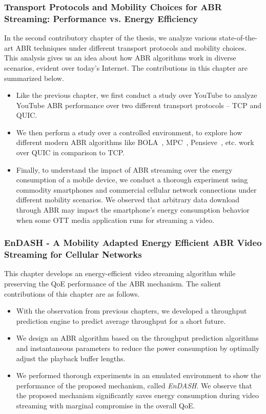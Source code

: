 \subsubsection{Transport Protocols and Mobility Choices for ABR Streaming: Performance vs. Energy Efficiency}
In the second contributory chapter of the thesis, we analyze various state-of-the-art ABR techniques under different transport protocols and mobility choices. This analysis gives us an idea about how ABR algorithms work in diverse scenarios, evident over today's Internet. The contributions in this chapter are summarized below. 
\begin{itemize}
	\item Like the previous chapter, we first conduct a study over YouTube to analyze YouTube ABR performance over two different transport protocols -- TCP and QUIC.
	\item We then perform a study over a controlled environment, to explore how different modern ABR algorithms like BOLA~\cite{Spiteri2016}, MPC~\cite{yin2015control}, Pensieve~\cite{mao2017neural}, etc. work over QUIC in comparison to TCP.
	\item Finally, to understand the impact of ABR streaming over the energy consumption of a mobile device, we conduct a thorough experiment using commodity smartphones and commercial cellular network connections under different mobility scenarios. We observed that arbitrary data download through ABR may impact the smartphone's energy consumption behavior when some OTT media application runs for streaming a video. 
\end{itemize}

\subsubsection{EnDASH - A Mobility Adapted Energy Efficient ABR Video Streaming for Cellular Networks}
This chapter develops an energy-efficient video streaming algorithm while preserving the QoE performance of the ABR mechanism. The salient contributions of this chapter are as follows. 
\begin{itemize}
	\item With the observation from previous chapters, we developed a throughput prediction engine to predict average throughput for a short future.
	\item We design an ABR algorithm based on the throughput prediction algorithms and instantaneous parameters to reduce the power consumption by optimally adjust the playback buffer lengths.
	\item We performed thorough experiments in an emulated environment to show the performance of the proposed mechanism, called \textit{EnDASH}. We observe that the proposed mechanism significantly saves energy consumption during video streaming with marginal compromise in the overall QoE. 
\end{itemize}


